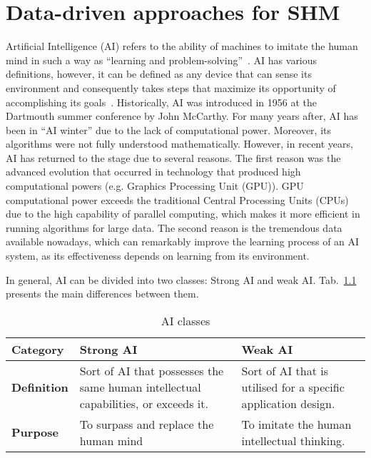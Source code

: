 \chapter[Data-driven for SHM]{Data-driven approaches for SHM}
\label{ch3}
Artificial Intelligence (AI) refers to the ability of machines to imitate the human mind in such a way as  \enquote{learning and problem-solving}~\cite{Russell2010}.
AI has various definitions, however, it can be defined as any device that can sense its environment and consequently takes steps that maximize its opportunity of accomplishing its goals~\cite{Russell2010}.
Historically, AI was introduced in 1956 at the Dartmouth summer conference by John McCarthy.
For many years after, AI has been in \enquote{AI winter} due to the lack of computational power.
Moreover, its algorithms were not fully understood mathematically.
However, in recent years, AI has returned to the stage due to several reasons. 
The first reason was the advanced evolution that occurred in technology that produced high computational powers (e.g. Graphics Processing Unit (GPU)). 
GPU computational power exceeds the traditional Central Processing Units (CPUs) due to the high capability of parallel computing, which makes it more efficient in running algorithms for large data.
The second reason is the tremendous data available nowadays, which can remarkably improve the learning process of an AI system, as its effectiveness depends on learning from its environment. 

In general, AI can be divided into two classes: Strong AI and weak AI. Tab.~\ref{tab:Strong_Weak_AI} presents the main differences between them.
\begin{table}[h]
	\renewcommand{\arraystretch}{1.1}
	\centering
	\caption{AI classes}
	\scriptsize
	\begin{tabular}{p{2cm}p{4cm}p{4cm}} 
		\toprule
		\textbf{Category} & \textbf{Strong AI} & \textbf{Weak AI} \\ \midrule
		\textbf{Definition} & Sort of AI that possesses the same human intellectual capabilities, or exceeds it. & Sort of AI that is utilised for a specific application design. \\ \midrule
		
		\textbf{Purpose} &To surpass and replace the human mind  &  To imitate the human intellectual thinking. \\  
		\bottomrule
	\end{tabular}
	\label{tab:Strong_Weak_AI}
\end{table}
